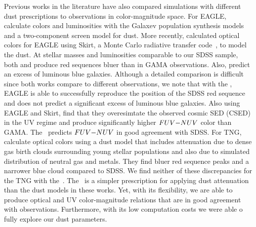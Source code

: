 Previous works in the literature have also compared simulations with different
dust prescriptions to observations in color-magnitude space. For EAGLE, 
\cite{trayford2015} calculate colors and luminosities with the {\sc Galaxev}
population synthesis models and a two-component screen model for dust. More
recently, \cite{trayford2017} calculated optical colors for EAGLE using {\sc
Skirt}, a Monte Carlo radiative transfer code~\citep{camps2015}, to model the
dust. At stellar masses and luminosities comparable to our SDSS sample, both 
\cite{trayford2015} and \cite{trayford2017} produce red sequences bluer than 
in GAMA observations. Also, \cite{trayford2015} predict an excess of luminous 
blue galaxies. Although a detailed comparison is difficult since both works 
compare to different observations, we note that with the \eda, EAGLE is able 
to successfully reproduce the position of the SDSS red sequence and does not 
predict a significant excess of luminous blue galaxies. Also using EAGLE and 
{\sc Skirt}, \cite{baes2019} find that they overesimtate the observed cosmic 
SED (CSED) in the UV regime and produce significantly higher $FUV{-}NUV$ color 
than GAMA. The \eda~predicts $FUV{-}NUV$ in good agreement with SDSS. 
For TNG, \cite{nelson2018} calculate optical colors using a dust model that
includes attenuation due to dense gas birth clouds surrounding young stellar
populations and also due to simulated distribution of neutral gas and metals.
They find bluer red sequence peaks and a narrower blue cloud compared to SDSS.
We find neither of these discrepancies for the TNG with the~\eda. The
\eda~is a simpler prescription for applying dust attenuation than the dust
models in these works. Yet, with its flexibility, we are able to produce
optical and UV color-magnitude relations that are in good agreement with
observations. Furthermore, with its low computation costs we were able o fully
explore our dust parameters. 

 

 






